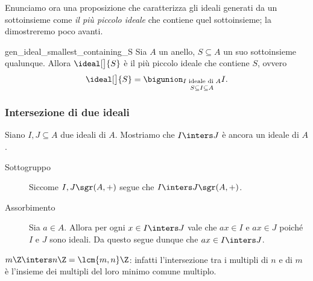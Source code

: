 Enunciamo ora una proposizione che caratterizza gli ideali generati da un sottoinsieme come \emph{il più piccolo ideale} che contiene quel sottoinsieme; la dimostreremo poco avanti.

\begin{proposition}{}
    {gen_ideal_smallest_containing_S}
    Sia $A$ un anello, $S \subseteq A$ un suo sottoinsieme qualunque. Allora $\ideal[\big]{S}$ è il più piccolo ideale che contiene $S$, ovvero \[
        \ideal[\big]{S} = \bigunion_{\substack{I \text{ ideale di }A \\[2pt] S \subseteq I \subseteq A}} I.  
    \]
\end{proposition}

\subsubsection{Intersezione di due ideali}

Siano $I, J \subseteq A$ due ideali di $A$. Mostriamo che $I \inters J$ è ancora un ideale di $A$.
\begin{description}
    \item[Sottogruppo] Siccome $I, J \sgr (A, +)$ segue che $I \inters J \sgr (A, +)$.
    \item[Assorbimento] Sia $a \in A$. Allora per ogni $x \in I \inters J$ vale che $ax \in I$ e $ax \in J$ poiché $I$ e $J$ sono ideali. Da questo segue dunque che $ax \in I \inters J$.
\end{description}

\begin{example}
    $m\Z \inters n\Z = \lcm{m, n}\Z$: infatti l'intersezione tra i multipli di $n$ e di $m$ è l'insieme dei multipli del loro minimo comune multiplo.
\end{example}

